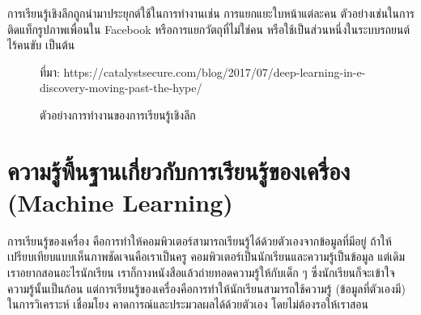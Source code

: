 การเรียนรู้เชิงลึกถูกนำมาประยุกต์ใช้ในการทำงานเช่น การแยกแยะใบหน้าแต่ละคน ตัวอย่างเช่นในการติดแท็กรูปภาพเพื่อนใน Facebook หรือการแยกวัตถุที่ไม่ใช่คน หรือใช้เป็นส่วนหนึ่งในระบบรถยนต์ไร้คนขับ เป็นต้น
\begin{figure}[H]
	\centering
	\caption{ตัวอย่างการทำงานของการเรียนรู้เชิงลึก}{ที่มา: https://catalystsecure.com/blog/2017/07/deep-learning-in-e-discovery-moving-past-the-hype/}
	\label{fig:deep learning}
\end{figure}
\newpage
\section{ความรู้พื้นฐานเกี่ยวกับการเรียนรู้ของเครื่อง (Machine Learning)}
การเรียนรู้ของเครื่อง \cite{machinelearning} คือการทำให้คอมพิวเตอร์สามารถเรียนรู้ได้ด้วยตัวเองจากข้อมูลที่มีอยู่ ถ้าให้เปรียบเทียบแบบเห็นภาพชัดเจนคือเราเป็นครู คอมพิวเตอร์เป็นนักเรียนและความรู้เป็นข้อมูล แต่เดิมเราอยากสอนอะไรนักเรียน เราก็กางหนังสือแล้วถ่ายทอดความรู้ให้กับเด็ก ๆ ซึ่งนักเรียนก็จะเข้าใจความรู้นั้นเป็นก้อน แต่การเรียนรู้ของเครื่องคือการทำให้นักเรียนสามารถใช้ความรู้ (ข้อมูลที่ตัวเองมี) ในการวิเคราะห์ เชื่อมโยง คาดการณ์และประมวลผลได้ด้วยตัวเอง โดยไม่ต้องรอให้เราสอน

